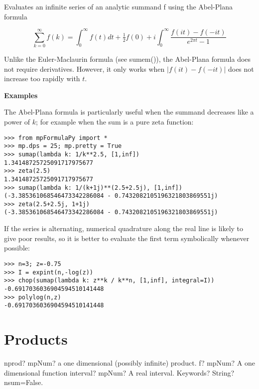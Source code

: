 \vpara
Evaluates an infinite series of an analytic summand f using the Abel-Plana formula

\begin{equation}
\sum_{k=0}^{\infty} f(k) = \int_0^{\infty} f(t)dt + \tfrac{1}{2}f(0) + i \int_0^{\infty} \frac{f(it)-f(-it)}{e^{2\pi t}-1}
\end{equation}

Unlike the Euler-Maclaurin formula (see sumem()), the Abel-Plana formula does not require derivatives. However, it only works when $|f(it)-f(-it)|$ does not increase too rapidly with $t$.

\vpara
\textbf{Examples}

The Abel-Plana formula is particularly useful when the summand decreases like a power of $k$; for example when the sum is a pure zeta function:

\begin{lstlisting}
>>> from mpFormulaPy import *
>>> mp.dps = 25; mp.pretty = True
>>> sumap(lambda k: 1/k**2.5, [1,inf])
1.34148725725091717975677
>>> zeta(2.5)
1.34148725725091717975677
>>> sumap(lambda k: 1/(k+1j)**(2.5+2.5j), [1,inf])
(-3.385361068546473342286084 - 0.7432082105196321803869551j)
>>> zeta(2.5+2.5j, 1+1j)
(-3.385361068546473342286084 - 0.7432082105196321803869551j)
\end{lstlisting}

If the series is alternating, numerical quadrature along the real line is likely to give poor results, so it is better to evaluate the first term symbolically whenever possible:

\begin{lstlisting}
>>> n=3; z=-0.75
>>> I = expint(n,-log(z))
>>> chop(sumap(lambda k: z**k / k**n, [1,inf], integral=I))
-0.6917036036904594510141448
>>> polylog(n,z)
-0.6917036036904594510141448
\end{lstlisting}










\newpage
\section{Products}


\begin{mpFunctionsExtract}
	\mpFunctionThree
	{nprod? mpNum? a one dimensional (possibly infinite) product.}
	{f? mpNum? A one dimensional function}
	{interval? mpNum? A real interval.}	
	{Keywords? String? nsum=False.}	
\end{mpFunctionsExtract}



